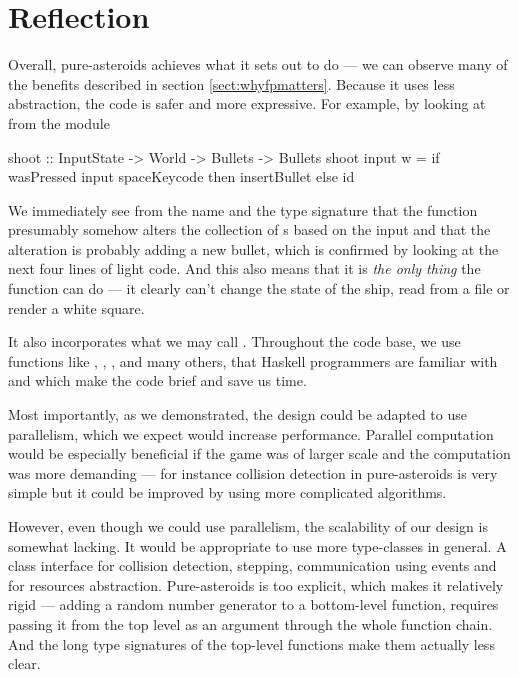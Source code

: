\documentclass[
  digital, %
  color,   %
  table,   %
  oneside, %
  lof,     %
  lot,     %
]{fithesis3}
\begin{document}
{%
\section{Reflection}
\label{sect:purereflection}

Overall, pure-asteroids achieves what it sets out to do --- we can observe
many of the benefits described in section \ref{sect:whyfpmatters}.
Because it uses less abstraction, the code is safer and more expressive.
For example, by looking at  from the  module
\begin{haskell}
shoot :: InputState -> World -> Bullets -> Bullets
shoot input w =
    if wasPressed input spaceKeycode
        then insertBullet
        else id
\end{haskell}
We immediately see from the name and the type signature that the function presumably
somehow alters the collection of s based on the input and that
the alteration is probably adding a new bullet, which is confirmed by looking
at the next four lines of light code. And this also means that it is \emph{the only thing}
the function can do --- it clearly can't change the state of the ship, read from a file
or render a white square.

It also incorporates what we may call .
Throughout the code base, we use functions like , ,
,  and many others, that Haskell programmers are familiar
with and which make the code brief and save us time.

Most importantly, as we demonstrated, the design could be adapted to
use parallelism, which we expect would increase performance.
Parallel computation would be especially beneficial if the game was of larger scale
and the computation was more demanding --- for instance collision detection
in pure-asteroids is very simple but it could be improved by using more
complicated algorithms.

However, even though we could use parallelism, the scalability of our design is somewhat lacking.
It would be appropriate to use more type-classes in general. A class interface for
collision detection, stepping, communication using events and for resources abstraction.
Pure-asteroids is too explicit, which makes it relatively rigid
--- adding a random number
generator to a bottom-level function, requires passing it from the top level
as an argument through the whole function chain. And the long type signatures of the
top-level functions make them actually less clear.

}
\end{document}
